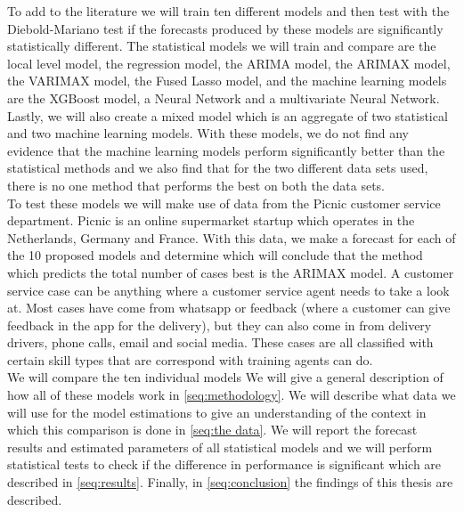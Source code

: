 To add to the literature we will train ten different models and then test with the Diebold-Mariano test if the forecasts produced by these models are significantly statistically different. The statistical models we will train and compare are the local level model, the regression model, the ARIMA model, the ARIMAX model, the VARIMAX model, the Fused Lasso model, and the machine learning models are the XGBoost model, a Neural Network and a multivariate Neural Network. Lastly, we will also create a mixed model which is an aggregate of two statistical and two machine learning models. With these models, we do not find any evidence that the machine learning models perform significantly better than the statistical methods and we also find that for the two different data sets used, there is no one method that performs the best on both the data sets.\\

To test these models we will make use of data from the Picnic customer service department. Picnic is an online supermarket startup which operates in the Netherlands, Germany and France.  With this data, we make a forecast for each of the 10 proposed models and determine which will conclude that the method which predicts the total number of cases best is the ARIMAX model. A customer service case can be anything where a customer service agent needs to take a look at. Most cases have come from whatsapp or feedback (where a customer can give feedback in the app for the delivery), but they can also come in from delivery drivers, phone calls, email and social media. These cases are all classified with certain skill types that are correspond with training agents can do.\\

We will compare the ten individual models We will give a general description of how all of these models work in \autoref{seq:methodology}. We will describe what data we will use for the model estimations to give an understanding of the context in which this comparison is done in \autoref{seq:the data}. We will report the forecast results and estimated parameters of all statistical models and we will perform statistical tests to check if the difference in performance is significant which are described in \autoref{seq:results}. Finally, in \autoref{seq:conclusion} the findings of this thesis are described.


